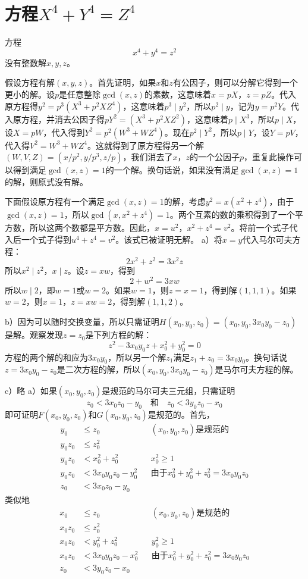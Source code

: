 \chapter{方程$X^4+Y^4=Z^4$}
\begin{theorem}
方程
\[x^4+y^4=z^2\]
没有整数解$x,y,z$。
\end{theorem}
%
\exercise \proof 假设方程有解$(x,y,z)$。首先证明，如果$x$和$z$有公因子，则可以分解它得到一个更小的解。设$p$是任意整除$\gcd(x,z)$的素数，这意味着$x=pX$，$z=pZ$。代入原方程得$y^2=p^3(X^3+p^2XZ^4)$，这意味着$p^3\mid y^2$，所以$p^2\mid y$，记为$y=p^2Y$。代入原方程，并消去公因子得$pY^2=(X^3+p^2XZ^2)$，这意味着$p\mid X^3$，所以$p\mid X$，设$X=pW$，代入得到$Y^2=p^2(W^3+WZ^4)$。现在$p^2\mid Y^2$，所以$p\mid Y$，设$Y=pV$，代入得$V^2=W^3+WZ^4$。这就得到了原方程得另一个解$(W,V,Z)=(x/p^2, y/p^3, z/p)$，我们消去了$x$，$z$的一个公因子$p$，重复此操作可以得到满足$\gcd(x,z)=1$的一个解。换句话说，如果没有满足$\gcd(x,z)=1$的解，则原式没有解。\par
下面假设原方程有一个满足$\gcd(x,z)=1$的解，考虑$y^2=x(x^2+z^4)$，由于$\gcd(x,z)=1$，所以$\gcd(x,x^2+z^4)=1$。两个互素的数的乘积得到了一个平方数，所以这两个数都是平方数。因此，$x=u^2$，$x^2+z^4=v^2$。将前一个式子代入后一个式子得到$u^4+z^4=v^2$。该式已被证明无解。
%
\exercise a）将$x=y$代入马尔可夫方程：
\[2x^2+z^2=3x^2z\]
所以$x^2\mid z^2$，$x\mid z$。设$z=xw$，得到
\[2+w^2=3xw\]
所以$w\mid 2$，即$w=1$或$w=2$。如果$w=1$，则$z=x=1$，得到解$(1,1,1)$。如果$w=2$，则$x=1$，$z=xw=2$，得到解$(1,1,2)$。\par
b）因为可以随时交换变量，所以只需证明$H(x_0,y_0,z_0)=(x_0,y_0,3x_0y_0-z_0)$是解。观察发现$z=z_0$是下列方程的解：
\[z^2-3x_0y_0z+x_0^2+y_0^2=0\]
方程的两个解的和应为$3x_0y_0$，所以另一个解$z_1$满足$z_1+z_0=3x_0y_0$。换句话说$z=3x_0y_0-z_0$是二次方程的解，所以$(x_0,y_0,3x_0y_0-z_0)$是马尔可夫方程的解。\par
c）略
%
\exercise a）\proof 如果$(x_0,y_0,z_0)$是规范的马尔可夫三元组，只需证明
\[z_0<3x_0z_0-y_0\quad\text{和}\quad z_0<3y_0z_0-x_0\]
即可证明$F(x_0,y_0,z_0)$和$G(x_0,y_0,z_0)$是规范的。首先，
\begin{align*}
y_0&\le z_0 &&\text{$(x_0,y_0,z_0)$是规范的} \\
y_0z_0&\le z_0^2 && \\
y_0z_0& < x_0^2+z_0^2 && x_0^2\ge1 \\
y_0z_0&<3x_0y_0z_0-y_0^2 && \text{由于}x_0^2+y_0^2+z_0^2=3x_0y_0z_0 \\
z_0&<3x_0z_0-y_0 &&
\end{align*}
类似地
\begin{align*}
x_0&\le z_0 &&\text{$(x_0,y_0,z_0)$是规范的} \\
x_0z_0&\le z_0^2 && \\
x_0z_0& < y_0^2+z_0^2 && y_0^2\ge1 \\
x_0z_0&<3x_0y_0z_0-x_0^2 && \text{由于}x_0^2+y_0^2+z_0^2=3x_0y_0z_0 \\
z_0&<3y_0z_0-x_0 &&
\end{align*}
